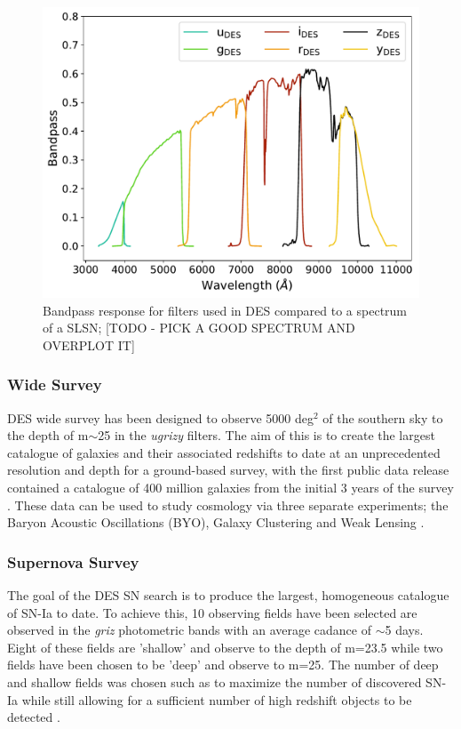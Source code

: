 \begin{figure}
  \centering
  \includegraphics[width=\textwidth]{Figures/Chapter2/DES_filters.pdf}
    \caption{Bandpass response for filters used in DES compared to a spectrum of a SLSN; [TODO - PICK A GOOD SPECTRUM AND OVERPLOT IT]}
    \label{fig:DESFilters}
\end{figure}

\subsubsection{Wide Survey}
DES wide survey has been designed to observe 5000 deg$^2$ of the southern sky to the depth of m$\sim$25 in the \textit{ugrizy} filters. The aim of this is to create the largest catalogue of galaxies and their associated redshifts to date at an unprecedented resolution and depth for a ground-based survey, with the first public data release contained a catalogue of 400 million galaxies from the initial 3 years of the survey \citep{DES2018}. These data can be used to study cosmology via three separate experiments; the Baryon Acoustic Oscillations (BYO), Galaxy Clustering and Weak Lensing \citep{DES2016,Prat2017,Drlica-Wagner2017,DES2017}.

\subsubsection{Supernova Survey}
The goal of the DES SN search is to produce the largest, homogeneous catalogue of SN-Ia to date. To achieve this, 10 observing fields have been selected are observed in the \textit{griz} photometric bands with an average cadance of $\sim$5 days. Eight of these fields are 'shallow' and observe to the depth of m=23.5 while two fields have been chosen to be 'deep' and observe to m=25. The number of deep and shallow fields was chosen such as to maximize the number of discovered SN-Ia while still allowing for a sufficient number of high redshift objects to be detected \citep{Bernstein2012}.

